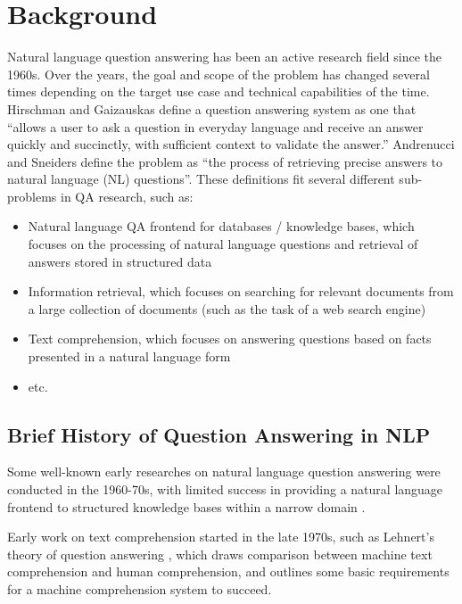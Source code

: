 \documentclass[]{article}
\begin{document}
\section{Background}

Natural language question answering has been an active research field since the 1960s. Over the years, the goal and scope of the problem has changed several times depending on the target use case and technical capabilities of the time. Hirschman and Gaizauskas \cite{hirschman2001natural} define a question answering system as one that “allows a user to ask a question in everyday language and receive an answer quickly and succinctly, with sufficient context to validate the answer.” Andrenucci and Sneiders \cite{andrenucci2005automated} define the problem as “the process of retrieving precise answers to natural language (NL) questions”. These definitions fit several different sub-problems in QA research, such as:
\begin{itemize}
\item 
Natural language QA frontend for databases / knowledge bases, which focuses on the processing of natural language questions and retrieval of answers stored in structured data 
\item
Information retrieval, which focuses on searching for relevant documents from a large collection of documents (such as the task of a web search engine) 
\item
Text comprehension, which focuses on answering questions based on facts presented in a natural language form 
\item
etc.
\end{itemize}

\subsection{Brief History of Question Answering in NLP}
Some well-known early researches on natural language question answering were conducted in the 1960-70s, with limited success in providing a natural language frontend to structured knowledge bases within a narrow domain \cite{hirschman2001natural}.

Early work on text comprehension started in the late 1970s, such as Lehnert’s theory of question answering \cite{lehnert1977conceptual}, which draws comparison between machine text comprehension and human comprehension, and outlines some basic requirements for a machine comprehension system to succeed.
\end{document}
